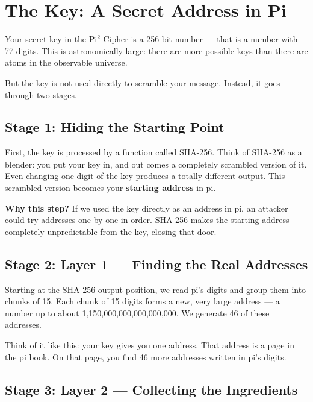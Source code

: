 \documentclass[12pt, a4paper]{article}
\begin{document}
\section{The Key: A Secret Address in Pi}

\vspace{0.5em}

Your secret key in the Pi$^2$ Cipher is a 256-bit number --- that is a number with 77 digits. This is astronomically large: there are more possible keys than there are atoms in the observable universe.

But the key is not used directly to scramble your message. Instead, it goes through two stages.

\subsection{Stage 1: Hiding the Starting Point}

First, the key is processed by a function called SHA-256. Think of SHA-256 as a blender: you put your key in, and out comes a completely scrambled version of it. Even changing one digit of the key produces a totally different output. This scrambled version becomes your \textbf{starting address} in pi.

\begin{amberbox}
\textbf{Why this step?} If we used the key directly as an address in pi, an attacker could try addresses one by one in order. SHA-256 makes the starting address completely unpredictable from the key, closing that door.
\end{amberbox}

\subsection{Stage 2: Layer 1 --- Finding the Real Addresses}

Starting at the SHA-256 output position, we read pi's digits and group them into chunks of 15. Each chunk of 15 digits forms a new, very large address --- a number up to about 1,150,000,000,000,000,000. We generate 46 of these addresses.

Think of it like this: your key gives you one address. That address is a page in the pi book. On that page, you find 46 more addresses written in pi's digits.

\subsection{Stage 3: Layer 2 --- Collecting the Ingredients}
\end{document}
